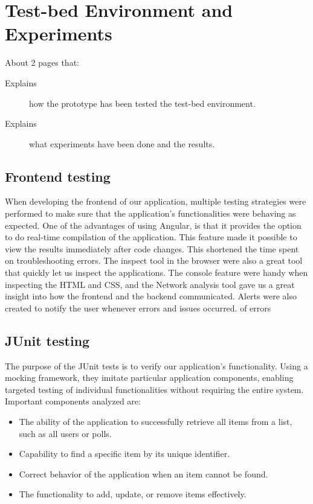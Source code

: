 \section{Test-bed Environment and Experiments}
\label{sec:evaluation}

About 2 pages that:

\begin{description}
\item[Explains] how the prototype has been tested the test-bed environment.

\item[Explains] what experiments have been done and the results.

\end{description}

\subsection{Frontend testing}
When developing the frontend of our application, multiple testing strategies were performed to make sure that the 
application's functionalities were behaving as expected. One of the advantages of using Angular, is that it provides 
the option to do real-time compilation of the application. This feature made it possible to view the results immediately 
after code changes. This shortened the time spent on troubleshooting errors. The inspect tool in the browser were 
also a great tool that quickly let us inspect the applications. The console feature were handy when inspecting the 
HTML and CSS, and the Network analysis tool gave us a great insight into how the frontend and the backend 
communicated. Alerts were also created to notify the user whenever errors and issues occurred. 
of errors 

\subsection{JUnit testing}
The purpose of the JUnit tests is to verify our application's functionality. Using a mocking framework, they imitate particular application components, enabling targeted testing of individual functionalities without requiring the entire system. Important components analyzed are:

\begin{itemize}
    \item The ability of the application to successfully retrieve all items from a list, such as all users or polls.
    \item Capability to find a specific item by its unique identifier.
    \item Correct behavior of the application when an item cannot be found.
    \item The functionality to add, update, or remove items effectively.
\end{itemize}

